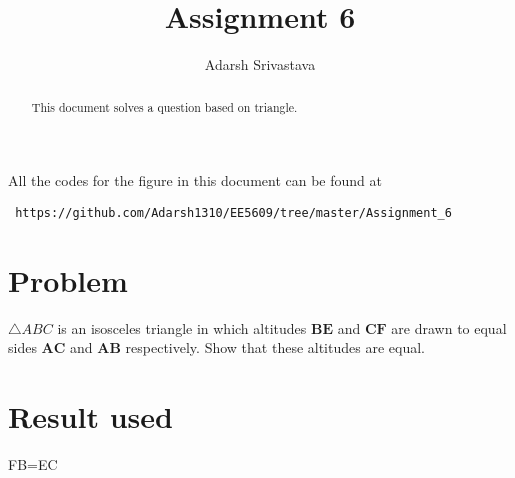 \documentclass[journal,12pt,twocolumn]{IEEEtran}
\begin{document}
 \makeatletter
 \makeatother
 \let\StandardTheFigure\thefigure
 \let\vec\mathbf
 \renewcommand{\thefigure}{\theproblem}
 \def\putbox#1#2#3{\makebox[0in][l]{\makebox[#1][l]{}\raisebox{\baselineskip}[0in][0in]{\raisebox{#2}[0in][0in]{#3}}}}
      \def\rightbox#1{\makebox[0in][r]{#1}}
      \def\centbox#1{\makebox[0in]{#1}}
      \def\topbox#1{\raisebox{-\baselineskip}[0in][0in]{#1}}
      \def\midbox#1{\raisebox{-0.5\baselineskip}[0in][0in]{#1}}
 \vspace{3cm}
 \title{Assignment 6}
 \author{Adarsh Srivastava}
 \maketitle
 \newpage
 \bigskip
 \renewcommand{\thefigure}{\theenumi}
 \renewcommand{\thetable}{\theenumi}
 \begin{abstract}
 This document solves a question based on triangle.
 \end{abstract}
 All the codes for the figure in this document can be found at
 \begin{lstlisting}
 https://github.com/Adarsh1310/EE5609/tree/master/Assignment_6
 \end{lstlisting}
 \section{Problem}
 $\triangle{ABC}$ is an isosceles triangle in which altitudes $\vec{BE}$ and $\vec{CF}$ are drawn to equal sides $\vec{AC}$ and $\vec{AB}$ respectively. Show that these altitudes are equal.
 \section{Result used}
 FB=EC
\end{document}
